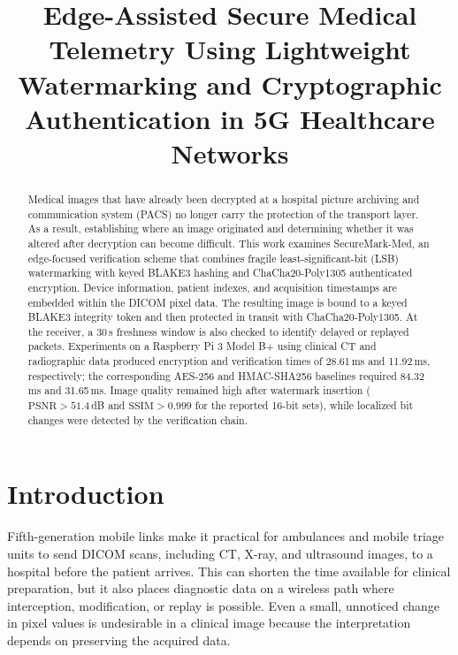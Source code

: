 \documentclass[runningheads]{llncs}
\begin{document}
\linespread{0.93}\selectfont

\title{Edge-Assisted Secure Medical Telemetry Using Lightweight Watermarking and Cryptographic Authentication in 5G Healthcare Networks}

\author{}
\authorrunning{}

\institute{}

\maketitle

\begin{abstract}
Medical images that have already been decrypted at a hospital picture archiving and communication system (PACS) no longer carry the protection of the transport layer. As a result, establishing where an image originated and determining whether it was altered after decryption can become difficult. This work examines SecureMark-Med, an edge-focused verification scheme that combines fragile least-significant-bit (LSB) watermarking with keyed BLAKE3 hashing and ChaCha20-Poly1305 authenticated encryption. Device information, patient indexes, and acquisition timestamps are embedded within the DICOM pixel data. The resulting image is bound to a keyed BLAKE3 integrity token and then protected in transit with ChaCha20-Poly1305. At the receiver, a 30\,s freshness window is also checked to identify delayed or replayed packets. Experiments on a Raspberry Pi 3 Model B+ using clinical CT and radiographic data produced encryption and verification times of 28.61\,ms and 11.92\,ms, respectively; the corresponding AES-256 and HMAC-SHA256 baselines required 84.32\,ms and 31.65\,ms. Image quality remained high after watermark insertion ($\text{PSNR} > 51.4$\,dB and $\text{SSIM} > 0.999$ for the reported 16-bit sets), while localized bit changes were detected by the verification chain.
\end{abstract}

\section{Introduction}

Fifth-generation mobile links make it practical for ambulances and mobile triage units to send DICOM scans, including CT, X-ray, and ultrasound images, to a hospital before the patient arrives. This can shorten the time available for clinical preparation, but it also places diagnostic data on a wireless path where interception, modification, or replay is possible. Even a small, unnoticed change in pixel values is undesirable in a clinical image because the interpretation depends on preserving the acquired data.
\end{document}
